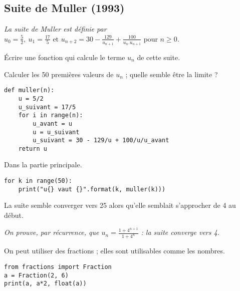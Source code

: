 \subsection{Suite de Muller (1993)}
{\it La suite de {\sc Muller} est définie par
$\displaystyle u_0 = \frac 52,\ u_1 = \frac{17}5 \text{ et }u_{n+2} = 30 - \frac {129}{u_{n+1}} + \frac {100}{u_n.u_{n+1}}\text{ pour }n\ge 0$.}
\begin{Exercise}[title= Calcul des termes] 
Écrire une fonction  qui calcule le terme $u_n$ de cette suite.

Calculer les 50 premières valeurs de $u_n$ ; quelle semble être la limite ?
\end{Exercise}
\begin{Answer}
\begin{lstlisting}
def muller(n):
    u = 5/2
    u_suivant = 17/5
    for i in range(n):
        u_avant = u
        u = u_suivant
        u_suivant = 30 - 129/u + 100/u/u_avant
    return u
\end{lstlisting}

Dans la partie principale.
\begin{lstlisting}
for k in range(50):
    print("u{} vaut {}".format(k, muller(k)))
\end{lstlisting}

La suite semble converger vers 25 alors qu'elle semblait s'approcher de 4 au début.
\end{Answer}
{\it On prouve, par récurrence, que $\displaystyle u_n = \frac{1+4^{n+1}}{1+4^{n}}$ : la suite converge vers 4.

On peut utiliser des fractions ; elles sont utilisables comme les nombres.}
\begin{lstlisting}
from fractions import Fraction
a = Fraction(2, 6)
print(a, a*2, float(a))
\end{lstlisting}

